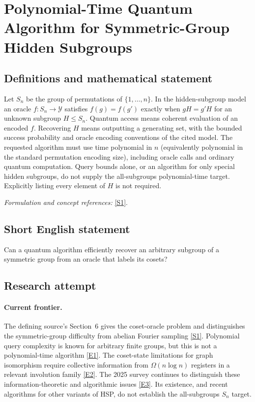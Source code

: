 \documentclass[11pt,a4paper]{article}
\newcommand{\sref}[2]{\hyperlink{source:#1:#2}{[S#2]}}
\newcommand{\eref}[2]{\hyperlink{extra:#1:#2}{[E#2]}}
\newif\ifshowcatalogue
\newcommand{\cataloguescope}[1]{\ifshowcatalogue
 \paragraph{Exact scope in the supplied catalogue.}
 \begin{quote}\small #1\end{quote}\fi}
\numberwithin{equation}{section}
\begin{document}
\setcounter{section}{184}
\clearpage
\section{\texorpdfstring{Polynomial-Time Quantum Algorithm for Symmetric-Group Hidden Subgroups}{Polynomial-Time Quantum Algorithm for Symmetric-Group Hidden Subgroups}}\label{185}
\subsection{Definitions and mathematical statement}
Let $S_n$ be the group of permutations of $\{1,\ldots,n\}$. In the hidden-subgroup model an oracle $f:S_n\to\mathcal Y$ satisfies
$f(g)=f(g')$ exactly when $gH=g'H$ for an unknown subgroup $H\le S_n$. Quantum access means coherent evaluation of an encoded $f$. Recovering $H$ means outputting a generating set, with the bounded success probability and oracle encoding conventions of the cited model. The requested algorithm must use time polynomial in $n$ (equivalently polynomial in the standard permutation encoding size), including oracle calls and ordinary quantum computation. Query bounds alone, or an algorithm for only special hidden subgroups, do not supply the all-subgroups polynomial-time target. Explicitly listing every element of $H$ is not required.
\par\smallskip\textit{Formulation and concept references:} \sref{185}{1}.
\cataloguescope{Give a polynomial-time quantum algorithm that recovers a subgroup hidden by an oracle over the symmetric group S\_n.}
\subsection{Short English statement}
Can a quantum algorithm efficiently recover an arbitrary subgroup of a symmetric group from an oracle that labels its cosets?
\subsection{Research attempt}

\paragraph{Current frontier.}
The defining source's Section~6 gives the coset-oracle problem and distinguishes the symmetric-group difficulty from abelian Fourier sampling \sref{185}{1}. Polynomial query complexity is known for arbitrary finite groups, but this is not a polynomial-time algorithm \eref{185}{1}. The coset-state limitations for graph isomorphism require collective information from $\Omega(n\log n)$ registers in a relevant involution family \eref{185}{2}. The 2025 survey continues to distinguish these information-theoretic and algorithmic issues \eref{185}{3}. Its existence, and recent algorithms for other variants of HSP, do not establish the all-subgroups $S_n$ target.
\end{document}
